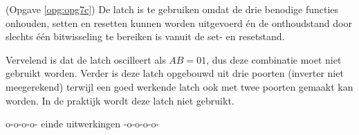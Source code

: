 \documentclass[a4paper,12pt,addpoints,fleqn,dutch,concept]{tisdexam}
\begin{document}
\begin{questions}
(Opgave \ref{opg:opg7c}) 
De latch is te gebruiken omdat de drie benodige functies onhouden, setten en
resetten kunnen worden uitgevoerd \'{e}n de onthoudstand door slechts
\'{e}\'{e}n bitwisseling te bereiken is vanuit de set- en resetstand.

Vervelend is dat de latch oscilleert als $AB = 01$, dus deze combinatie
moet niet gebruikt worden. Verder is deze latch opgebouwd uit drie poorten
(inverter niet meegerekend) terwijl een goed werkende latch ook met twee
poorten gemaakt kan worden. In de praktijk wordt deze latch niet gebruikt.

\vspace{4em}
\begin{center}
o-o-o-o- einde uitwerkingen -o-o-o-o-
\end{center}

\fi  %

\end{questions}
\end{document}
